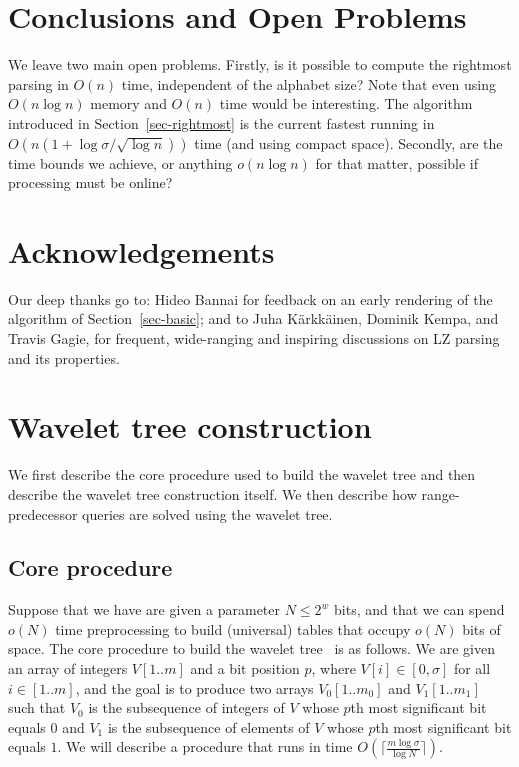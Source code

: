 \documentclass[11pt,runningheads]{llncs}
\begin{document}
\section{Conclusions and Open Problems}
\label{sec-conclusion}

We leave two main open problems. Firstly, is it possible to compute the rightmost parsing
in $O(n)$ time, independent of the alphabet size? Note that even using $O(n\log n)$ memory 
and $O(n)$ time would be interesting. The algorithm introduced in Section~\ref{sec-rightmost} 
is the current fastest running in $O(n(1 + \log\sigma / \sqrt{\log n}))$ time (and using 
compact space). Secondly, are the time bounds we achieve, or anything $o(n\log n)$ for 
that matter, possible if processing must be online?

\section*{Acknowledgements} 
Our deep thanks go to: Hideo Bannai for feedback 
on an early rendering of the algorithm of Section~\ref{sec-basic};
and to Juha K{\"a}rkk{\"a}inen, Dominik Kempa, and Travis Gagie, for frequent,
wide-ranging and inspiring discussions on LZ parsing and its properties.

\newpage



\newpage
\appendix

\section{Wavelet tree construction}
\label{sec:wavelet_tree}
We first describe the core procedure used to build the wavelet tree and 
then describe the wavelet tree construction itself. We then describe
how range-predecessor queries are solved using the wavelet tree. 

\subsection{Core procedure}
\label{subsubsec:core_procedure}
Suppose that we have are given a parameter $N\leq 2^w$ bits, and that we 
can spend $o(N)$ time preprocessing to build (universal) tables that occupy $o(N)$ bits of space. 
The core procedure to build the wavelet tree~\cite{CP2010,MNV14,BGKS15} is as follows.
We are given an array of integers $V[1..m]$ and a bit position $p$, where 
$V[i]\in[0,\sigma]$ for all $i\in[1..m]$, 
and the goal is to produce two arrays $V_0[1..m_0]$ and $V_1[1..m_1]$ 
such that $V_0$ is the subsequence of integers of $V$ whose $p$th 
most significant bit equals $0$ and $V_1$ is the subsequence of elements of $V$ whose 
$p$th most significant bit equals $1$. We will describe a procedure that runs 
in time $O(\lceil\frac{m\log\sigma}{\log N}\rceil)$.
\end{document}
